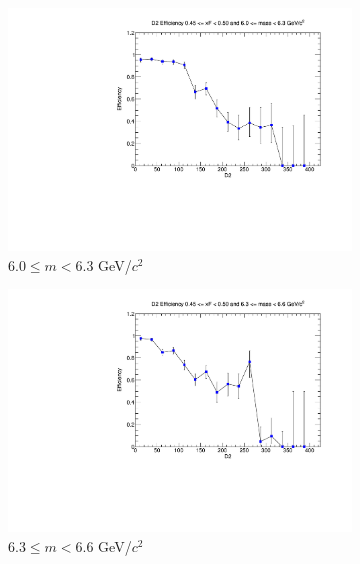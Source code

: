 \documentclass[11pt]{article}
\begin{document}
\begin{figure}[p]
\begin{subfigure}[b]{0.32\textwidth}
        \includegraphics[width=\textwidth]{./kTrackerEfficiencyPlots/D2_Efficiency_xF9_mass6.pdf}
        \caption{$6.0 \leq m < 6.3$ GeV/$c^2$}
    \end{subfigure}\hfill
    \begin{subfigure}[b]{0.32\textwidth}
        \centering
        \includegraphics[width=\textwidth]{./kTrackerEfficiencyPlots/D2_Efficiency_xF9_mass7.pdf}
        \caption{$6.3 \leq m < 6.6$ GeV/$c^2$}
    \end{subfigure}\hfill
    \begin{subfigure}[b]{0.32\textwidth}
        \centering

\end{subfigure}
\end{figure}
\end{document}
